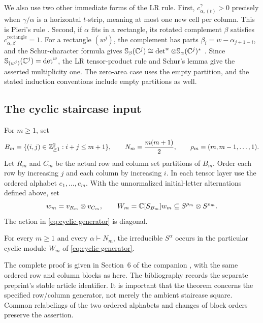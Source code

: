 We also use two other immediate forms of the LR rule. First,
$c_{\alpha,(t)}^\gamma>0$ precisely when $\gamma/\alpha$ is a
horizontal $t$-strip, meaning at most one new cell per column.
This is Pieri's rule \cite[Chapter~I, (5.16)--(5.17)]{Macdonald}.
Second, if $\alpha$ fits in a rectangle, its rotated complement
$\beta$ satisfies $c_{\alpha,\beta}^{\text{rectangle}}=1$.
For a rectangle $(w^j)$, the complement has parts
$\beta_i=w-\alpha_{j+1-i}$, and the Schur-character formula gives
$\mathbb S_\beta(\mathbb C^j)\cong\det^w\otimes
\mathbb S_\alpha(\mathbb C^j)^*$
\cite[Chapter~I, (3.1); Appendix~A, (8.2) and (8.4)]{Macdonald}.
Since $\mathbb S_{(w^j)}(\mathbb C^j)=\det^w$, the LR tensor-product
rule and Schur's lemma give the asserted multiplicity one.
The zero-area case uses the empty partition, and the stated induction
conventions include empty partitions as well.

\subsection{The cyclic staircase input}

For $m\ge1$, set
\[
 B_m=\{(i,j)\in\mathbb Z_{\ge1}^2:i+j\le m+1\},\qquad
 N_m=\frac{m(m+1)}2,\qquad \rho_m=(m,m-1,\ldots,1).
\]
Let $R_m$ and $C_m$ be the actual row and column set partitions of
$B_m$. Order each row by increasing $j$ and each column by increasing
$i$. In each tensor layer use the ordered alphabet $e_1,\ldots,e_m$.
With the unnormalized initial-letter alternations defined above, set
\begin{equation}\label{eq:cyclic-generator}
 w_m=v_{R_m}\otimes v_{C_m},\qquad
 W_m=\mathbb C[S_{B_m}]w_m\subseteq S^{\rho_m}\otimes S^{\rho_m}.
\end{equation}
The action in \eqref{eq:cyclic-generator} is diagonal.

\begin{theorem}
\label{thm:cyclic-input}
For every $m\ge1$ and every $\alpha\vdash N_m$, the irreducible
$S^\alpha$ occurs in the particular cyclic module $W_m$ of
\eqref{eq:cyclic-generator}.
\end{theorem}

The complete proof is given in Section~6 of the companion
\cite{SaxlCyclic}, with the same ordered row and column blocks as here.
The bibliography records the separate preprint's stable article identifier.
It is important that the theorem concerns the specified row/column
generator, not merely the ambient staircase square.
Common relabelings of the two ordered alphabets and changes of
block orders preserve the assertion.
